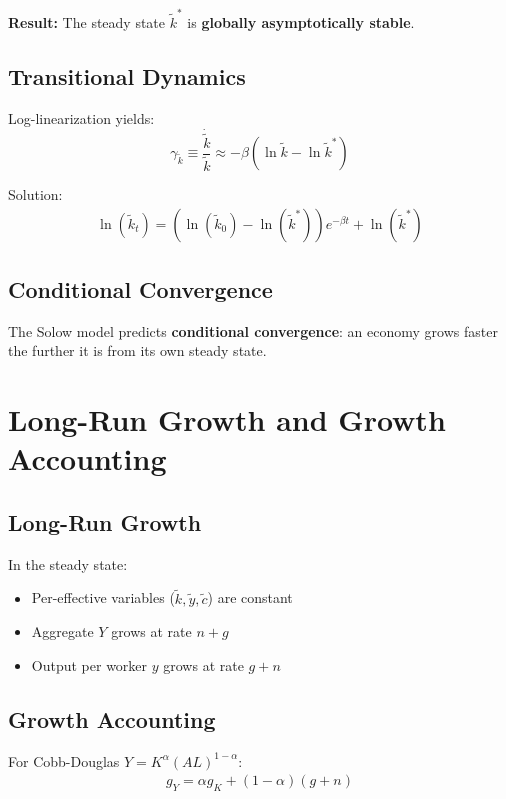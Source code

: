 \documentclass[a4paper,11pt]{article}
\newcommand{\ktilde}{\tilde{k}}
\newcommand{\ytilde}{\tilde{y}}
\newcommand{\ctilde}{\tilde{c}}
\begin{document}
\medskip
\noindent \textbf{Result:} The steady state $\ktilde^{*}$ is \textbf{globally asymptotically stable}.

\subsection*{Transitional Dynamics}
Log-linearization yields:
\[
\gamma_{\ktilde} \equiv \frac{\dot{\ktilde}}{\ktilde} \approx -\beta (\ln \ktilde - \ln \ktilde^{*})
\]

Solution:
\begin{align*}
\ln(\ktilde_t) = (\ln(\ktilde_0) - \ln(\ktilde^{*}))e^{-\beta t} + \ln(\ktilde^{*})
\tag{Transition}
\end{align*}

\subsection*{Conditional Convergence}
The Solow model predicts \textbf{conditional convergence}: an economy grows faster the further it is from its own steady state.

\clearpage

\section{Long-Run Growth and Growth Accounting}

\subsection*{Long-Run Growth}
In the steady state:
\begin{itemize}
    \item Per-effective variables ($\ktilde, \ytilde, \ctilde$) are constant
    \item Aggregate $Y$ grows at rate $n + g$
    \item Output per worker $y$ grows at rate $g + n$
\end{itemize}

\subsection*{Growth Accounting}
For Cobb-Douglas $Y = K^\alpha (AL)^{1-\alpha}$:
\begin{align*}
g_Y = \alpha g_K + (1-\alpha)(g + n)
\tag{Growth Accounting}
\end{align*}
\end{document}
